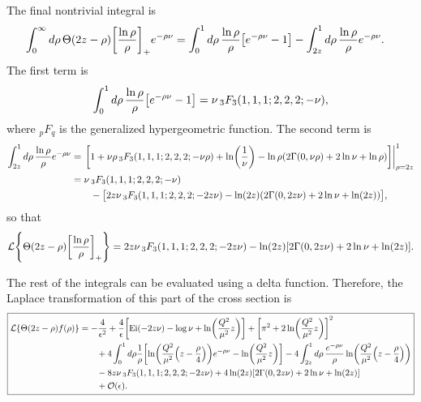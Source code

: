 \documentclass[11pt,twoside,reqno]{amsart}
\theoremstyle{plain}
\theoremstyle{remark}
\theoremstyle{definition}
\theoremstyle{remark}
\theoremstyle{definition}
\theoremstyle{definition}
\newcommand{\cL}{\mathcal{L}}
\newcommand{\cO}{\mathcal{O}}
\newcommand{\Ei}{\mathrm{Ei}}
\begin{document}
	The final nontrivial integral is
	\begin{equation}
	\begin{aligned}
		\int_0^\infty d\rho\,\Theta(2z-\rho) \qty[\frac{\ln\rho}{\rho}]_+ e^{-\rho \nu} &= \int_0^1 d\rho\, \frac{\ln\rho}{\rho}\qty[e^{-\rho\nu} - 1] - \int_{2z}^1 d\rho\, \frac{\ln\rho}{\rho}e^{-\rho\nu}.
 	\end{aligned}
	\end{equation}
	The first term is
	\begin{equation}
	\begin{aligned}
		\int_0^1 d\rho\, \frac{\ln\rho}{\rho}\qty[e^{-\rho\nu} - 1] = \nu \,_3F_3(1, 1, 1; 2, 2, 2; -\nu),
	\end{aligned}
	\end{equation}
	where $_pF_q$ is the generalized hypergeometric function. The second term is
	\begin{equation}
	\begin{aligned}
		\int_{2z}^1 d\rho\, \frac{\ln\rho}{\rho}e^{-\rho\nu} &= \eval{\qty[1 + \nu\rho\, _3F_3(1, 1, 1; 2, 2, 2; -\nu\rho) + \ln(\frac{1}{\nu}) - \ln\rho \qty(2\Gamma(0, \nu\rho) + 2\ln\nu + \ln\rho)]}_{\rho = 2z}^1 \\
		&= \nu \, _3F_3(1, 1, 1; 2, 2, 2; -\nu) \\
			&\qquad - \big[2z\nu \, _3F_3(1, 1, 1; 2, 2, 2; -2z\nu) - \ln(2z)\qty(2\Gamma(0, 2z\nu) + 2\ln\nu + \ln(2z)) \big],
	\end{aligned}
	\end{equation}
	so that
	\begin{equation}
		\cL\qty{\Theta(2z - \rho) \qty[\frac{\ln\rho}{\rho}]_+} = 2z\nu \, _3F_3(1, 1, 1; 2, 2, 2; -2z\nu) - \ln(2z)\qty[2\Gamma(0, 2z\nu) + 2\ln\nu + \ln(2z)].
	\end{equation}

	The rest of the integrals can be evaluated using a delta function. Therefore, the Laplace transformation of this part of the cross section is
	\begin{equation}
	\boxed{
	\begin{aligned}
		\cL\qty{\Theta(2z - \rho) f(\rho)} &= -\frac{4}{\epsilon^2} + \frac{4}{\epsilon}\qty[\Ei(-2z\nu) - \log\nu + \ln(\frac{Q^2}{\mu^2}z)] + \qty[\pi^2 + 2\ln(\frac{Q^2}{\mu^2}z)]^2 \\
			&\qquad + 4\int_0^1 d\rho \frac{1}{\rho}\qty[\ln(\frac{Q^2}{\mu^2}\qty(z - \frac{\rho}{4}))e^{-\rho\nu} - \ln(\frac{Q^2}{\mu^2}z)] - 4\int_{2z}^1 d\rho \, \frac{e^{-\rho \nu}}{\rho} \ln(\frac{Q^2}{\mu^2}\qty(z - \frac{\rho}{4})) \\
			&\qquad - 8z\nu \, _3F_3(1, 1, 1; 2, 2, 2; -2z\nu) + 4\ln(2z)\qty[2\Gamma(0, 2z\nu) + 2\ln\nu + \ln(2z)] \\
			&\qquad + \cO(\epsilon).
	\end{aligned}
	}
	\end{equation}




\end{document}
